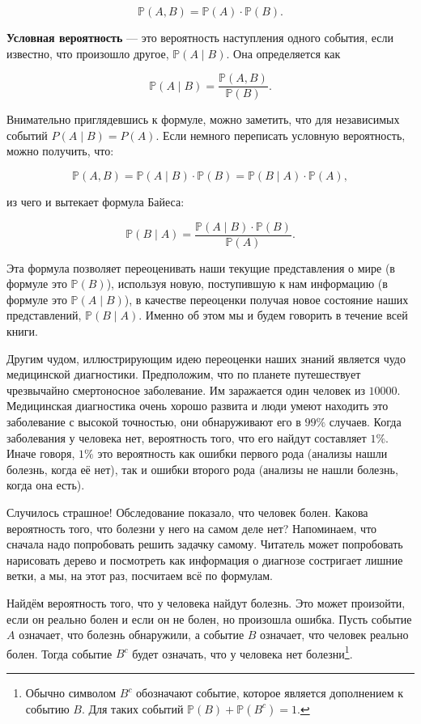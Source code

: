 \documentclass[12pt, a4paper, oneside]{extreport}
\def \mbb{\mathbb}
\def \PP{\mbb{P}}
\newcommand{\indef}[1]{\textbf{#1}}     %
\theoremstyle{plain}              %
\theoremstyle{definition}         %
\begin{document}
\[ \PP(A,B) = \PP(A) \cdot \PP(B).\]

\indef{Условная вероятность} --- это вероятность наступления одного события, если известно, что произошло другое, $\PP(A \mid B)$.  Она определяется как

\[ \PP(A \mid B) = \frac{\PP(A, B)}{\PP(B)}.\]

Внимательно приглядевшись к формуле, можно заметить, что для независимых событий $P(A \mid B) = P(A).$  Если немного переписать условную вероятность, можно получить, что: 

\[ \PP(A, B) = \PP(A \mid B) \cdot \PP(B) = \PP(B \mid A) \cdot \PP(A), \] 

из чего и вытекает формула Байеса:

\[ \PP(B  \mid A) = \frac{\PP(A \mid B) \cdot \PP(B)}{\PP(A)}.\]

Эта формула позволяет переоценивать наши текущие представления о мире (в формуле это $\PP(B)$), используя новую, поступившую к нам информацию (в формуле это $\PP(A \mid B)$), в качестве переоценки получая новое состояние наших представлений, $\PP(B \mid A)$.  Именно об этом мы и будем говорить в течение всей книги.

Другим чудом, иллюстрирующим идею переоценки наших знаний является чудо медицинской диагностики.  Предположим, что по планете путешествует чрезвычайно смертоносное заболевание. Им заражается один человек из $10 000$.  Медицинская диагностика очень хорошо развита и люди умеют находить это заболевание с высокой точностью, они обнаруживают его в $99\%$ случаев. Когда заболевания у человека нет, вероятность того, что его найдут составляет $1\%$.  Иначе говоря, $1\%$ это вероятность как ошибки первого рода (анализы нашли болезнь, когда её нет), так и ошибки второго рода (анализы не нашли болезнь, когда она есть). 

Случилось страшное! Обследование показало, что человек болен. Какова вероятность того, что болезни у него на самом деле нет? Напоминаем, что сначала надо попробовать решить задачку самому. Читатель может попробовать нарисовать дерево и посмотреть как информация о диагнозе состригает лишние ветки, а мы, на этот раз, посчитаем всё по формулам.

Найдём вероятность того, что у человека найдут болезнь. Это может произойти, если он реально болен и если он не болен, но произошла ошибка.  Пусть событие $A$ означает, что болезнь обнаружили, а событие $B$ означает, что человек реально болен.  Тогда событие $B^{c}$ будет означать, что у человека нет болезни\footnote{Обычно символом $B^c$ обозначают событие, которое является дополнением к событию $B$. Для таких событий $\PP(B) + \PP(B^c) = 1$.}. 
\end{document}
